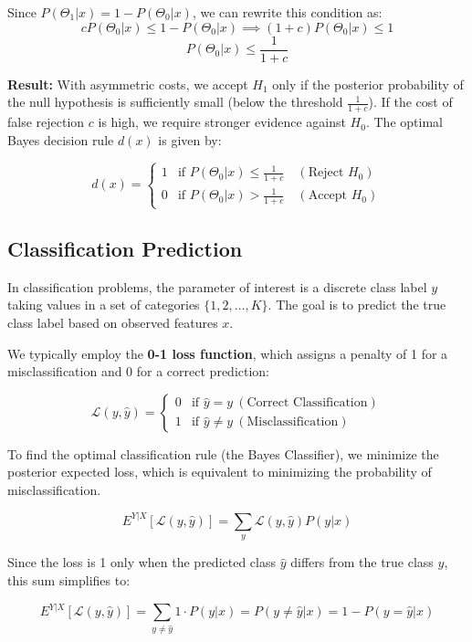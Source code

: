 \documentclass[
  letterpaper,
  DIV=11,
  numbers=noendperiod]{scrreprt}
\renewcommand{\[}{\begin{equation}}
\renewcommand{\]}{\end{equation}}
\theoremstyle{definition}
\theoremstyle{plain}
\theoremstyle{plain}
\theoremstyle{plain}
\theoremstyle{definition}
\theoremstyle{plain}
\theoremstyle{remark}
\begin{document}
Since \(P(\Theta_1|x) = 1 - P(\Theta_0|x)\), we can rewrite this
condition as: \[
c P(\Theta_0|x) \le 1 - P(\Theta_0|x) \implies (1+c) P(\Theta_0|x) \le 1
\] \[
P(\Theta_0|x) \le \frac{1}{1+c}
\]

\textbf{Result:} With asymmetric costs, we accept \(H_1\) only if the
posterior probability of the null hypothesis is sufficiently small
(below the threshold \(\frac{1}{1+c}\)). If the cost of false rejection
\(c\) is high, we require stronger evidence against \(H_0\). The optimal
Bayes decision rule \(d(x)\) is given by:

\[
d(x) = \begin{cases} 
1 & \text{if } P(\Theta_0|x) \le \frac{1}{1+c} \quad (\text{Reject } H_0) \\ 
0 & \text{if } P(\Theta_0|x) > \frac{1}{1+c} \quad (\text{Accept } H_0) 
\end{cases}
\]

\subsection{Classification Prediction}\label{classification-prediction}

In classification problems, the parameter of interest is a discrete
class label \(y\) taking values in a set of categories
\(\{1, 2, \dots, K\}\). The goal is to predict the true class label
based on observed features \(x\).

We typically employ the \textbf{0-1 loss function}, which assigns a
penalty of 1 for a misclassification and 0 for a correct prediction:

\[\mathcal{L}(y, \hat{y}) = \begin{cases} 0 & \text{if } \hat{y} = y \ (\text{Correct Classification}) \\ 1 & \text{if } \hat{y} \neq y \ (\text{Misclassification}) \end{cases}\]

To find the optimal classification rule (the Bayes Classifier), we
minimize the posterior expected loss, which is equivalent to minimizing
the probability of misclassification.

\[
E^{Y|X}[\mathcal{L}(y, \hat{y})] = \sum_{y} \mathcal{L}(y, \hat{y}) P(y|x)
\]

Since the loss is 1 only when the predicted class \(\hat{y}\) differs
from the true class \(y\), this sum simplifies to:

\[
E^{Y|X}[\mathcal{L}(y, \hat{y})] = \sum_{y \neq \hat{y}} 1 \cdot P(y|x) = P(y \neq \hat{y} | x) = 1 - P(y = \hat{y} | x)
\]
\end{document}
